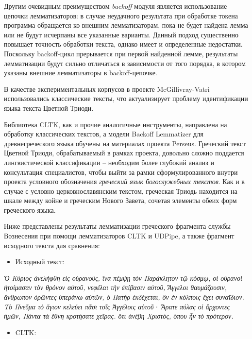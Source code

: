 \documentclass[
  letterpaper,
]{book}
\providecommand{\tightlist}{%
  \setlength{\itemsep}{0pt}\setlength{\parskip}{0pt}}\usepackage{longtable,booktabs,array}
\begin{document}
Другим очевидным преимуществом \emph{backoff} модуля является
использование цепочки лемматизаторов: в случае неудачного результата при
обработке токена программа обращается ко внешним лемматизаторам, пока не
будет найдена лемма или не будут исчерпаны все указанные варианты.
Данный подход существенно повышает точность обработки текста, однако
имеет и определенные недостатки. Поскольку backoff-цикл прерывается при
первой найденной лемме, результаты лемматизации будут сильно отличаться
в зависимости от того порядка, в котором указаны внешние лемматизаторы в
backoff-цепочке.

В качестве экспериментальных корпусов в проекте McGillivray-Vatri
использовались классические тексты, что актуализирует проблему
идентификации языка текста Цветной Триоди.

Библиотека CLTK, как и прочие аналогичные инструменты, направлена на
обработку классических текстов, а модели Backoff Lemmatizer для
древнегреческого языка обучены на материалах проекта Perseus. Греческий
текст Цветной Триоди, обрабатываемый в рамках проекта, довольно сложно
поддается лингвистической классификации -- необходим более глубокий
анализ и консультация специалистов, чтобы выйти за рамки
сформулированного внутри проекта условного обозначения \emph{греческий
язык богослужебных текстов}. Как и в случае с условно церковнославянским
текстом, греческая Триодь находится на шкале между койне и греческим
Нового Завета, сочетая элементы обеих форм греческого языка.

Ниже представлены результаты лемматизации греческого фрагмента службы
Вознесения при помощи лемматизаторов CLTK и UDPipe, а также фрагмент
исходного текста для сравнения:

\begin{itemize}
\tightlist
\item
  Исходный текст:
\end{itemize}

\emph{Ὁ Κύριος ἀνελήφθη εἰς οὐρανούς, ἵνα πέμψῃ τὸν Παράκλητον τῷ κόσμῳ,
οἱ οὐρανοὶ ἡτοίμασαν τὸν θρόνον αὐτοῦ, νεφέλαι τὴν ἐπίβασιν αὐτοῦ,
Ἄγγελοι θαυμάζουσιν, ἄνθρωπον ὁρῶντες ὑπεράνω αὐτῶν, ὁ Πατὴρ ἐκδέχεται,
ὃν ἐν κόλποις ἔχει συναΐδιον. Τὸ Πνεῦμα τὸ ἅγιον κελεύει πᾶσι τοῖς
Ἀγγέλοις αὐτοῦ· Ἄρατε πύλας οἱ ἄρχοντες ἡμῶν, Πάντα τὰ ἔθνη κροτήσατε
χεῖρας. ὅτι ἀνέβη Χριστός, ὅπου ἦν τὸ πρότερον.}

\begin{itemize}
\tightlist
\item
  CLTK:
\end{itemize}
\end{document}
